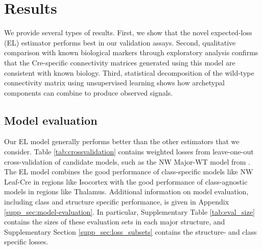 \section{Results}
\label{sec:results}

We provide several types of results.
First, we show that the novel expected-loss (EL) estimator performs best in our validation assays.
Second, qualitative comparison with known biological markers through exploratory analysis confirms that the Cre-specific connectivity matrices generated using this model are consistent with known biology. 
Third, statistical decomposition of the wild-type connectivity matrix using unsupervised learning shows how archetypal components can combine to produce observed signals.

\subsection{Model evaluation}
\label{sec:model_eval}

Our EL model generally performs better than the other estimators that we consider.
Table \ref{tab:crossvalidation} contains weighted losses from leave-one-out cross-validation of candidate models, such as the NW Major-WT model from  \citet{Knox2019-ot}.
The EL model combines the good performance of class-specific models like NW Leaf-Cre in regions like Isocortex with the good performance of class-agnostic models in regions like Thalamus.
Additional information on model evaluation, including class and structure specific performance, is given in Appendix \ref{supp_sec:model-evaluation}.
In particular, Supplementary Table \ref{tab:eval_size} contains the sizes of these evaluation sets in each major structure, and Supplementary Section \ref{supp_sec:loss_subsets} contains the structure- and class specific losses.

